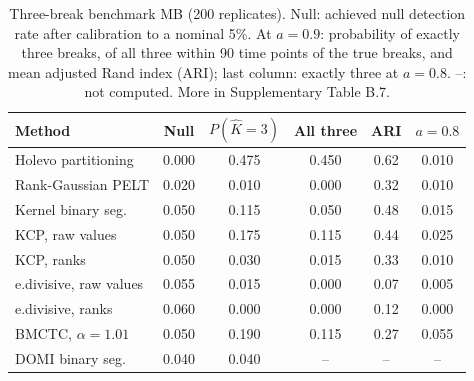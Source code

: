 \begin{table}[!t]
\centering
\caption{Three-break benchmark MB (200 replicates). Null: achieved null detection rate after calibration to a nominal 5\%. At $a=0.9$: probability of exactly three breaks, of all three within 90 time points of the true breaks, and mean adjusted Rand index (ARI); last column: exactly three at $a=0.8$. --: not computed. More in Supplementary Table B.7.}
\footnotesize
\setlength{\tabcolsep}{3pt}
\begin{tabular}{l ccccc}
\toprule
Method & Null & $P(\hat K{=}3)$ & All three & ARI & $a{=}0.8$ \\
\midrule
Holevo partitioning & 0.000 & 0.475 & 0.450 & 0.62 & 0.010 \\
Rank-Gaussian PELT & 0.020 & 0.010 & 0.000 & 0.32 & 0.010 \\
Kernel binary seg. & 0.050 & 0.115 & 0.050 & 0.48 & 0.015 \\
KCP, raw values & 0.050 & 0.175 & 0.115 & 0.44 & 0.025 \\
KCP, ranks & 0.050 & 0.030 & 0.015 & 0.33 & 0.010 \\
e.divisive, raw values & 0.055 & 0.015 & 0.000 & 0.07 & 0.005 \\
e.divisive, ranks & 0.060 & 0.000 & 0.000 & 0.12 & 0.000 \\
BMCTC, $\alpha{=}1.01$ & 0.050 & 0.190 & 0.115 & 0.27 & 0.055 \\
DOMI binary seg. & 0.040 & 0.040 & -- & -- & -- \\
\bottomrule
\end{tabular}
\label{tab:mb}
\end{table}
